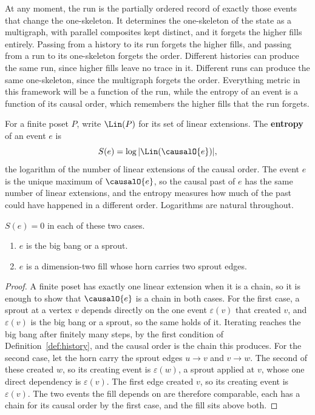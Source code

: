 At any moment, the run is the partially ordered record of exactly those events that change the one-skeleton.
It determines the one-skeleton of the state as a multigraph, with parallel composites kept distinct, and it forgets the higher fills entirely.
Passing from a history to its run forgets the higher fills, and passing from a run to its one-skeleton forgets the order.
Different histories can produce the same run, since higher fills leave no trace in it.
Different runs can produce the same one-skeleton, since the multigraph forgets the order.
Everything metric in this framework will be a function of the run, while the entropy of an event is a function of its causal order, which remembers the higher fills that the run forgets.

\begin{definition}[Entropy]
\label{def:entropy}
For a finite poset $P$, write $\Lin(P)$ for its set of linear extensions.
The \textbf{entropy} of an event $e$ is
\[
S(e) = \log |\Lin(\causalO{e})|,
\]
the logarithm of the number of linear extensions of the causal order.
The event $e$ is the unique maximum of $\causalO{e}$, so the causal past of $e$ has the same number of linear extensions, and the entropy measures how much of the past could have happened in a different order.
Logarithms are natural throughout.
\end{definition}

\begin{proposition}
\label{prop:zeroentropy}
$S(e) = 0$ in each of these two cases.
\begin{enumerate}
  \item $e$ is the big bang or a sprout.
  \item $e$ is a dimension-two fill whose horn carries two sprout edges.
\end{enumerate}
\end{proposition}

\begin{proof}
A finite poset has exactly one linear extension when it is a chain, so it is enough to show that $\causalO{e}$ is a chain in both cases.
For the first case, a sprout at a vertex $v$ depends directly on the one event $\varepsilon(v)$ that created $v$, and $\varepsilon(v)$ is the big bang or a sprout, so the same holds of it.
Iterating reaches the big bang after finitely many steps, by the first condition of Definition~\ref{def:history}, and the causal order is the chain this produces.
For the second case, let the horn carry the sprout edges $u \to v$ and $v \to w$.
The second of these created $w$, so its creating event is $\varepsilon(w)$, a sprout applied at $v$, whose one direct dependency is $\varepsilon(v)$.
The first edge created $v$, so its creating event is $\varepsilon(v)$.
The two events the fill depends on are therefore comparable, each has a chain for its causal order by the first case, and the fill sits above both.
\end{proof}

